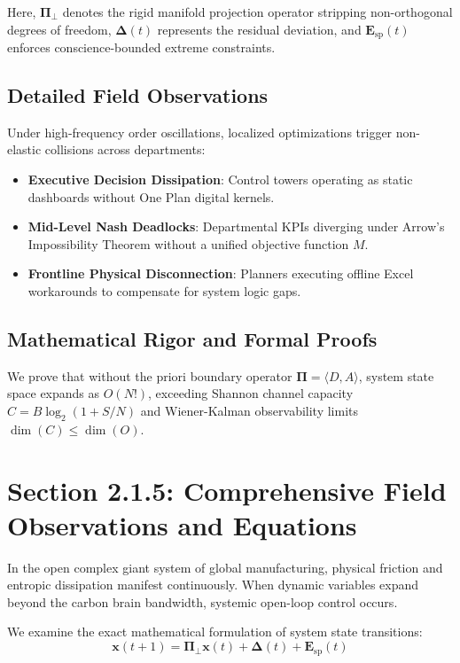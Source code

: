 \documentclass[12pt,a4paper,oneside]{book}
\begin{document}
Here, $\mathbf{\Pi}_{\bot}$ denotes the rigid manifold projection operator stripping non-orthogonal degrees of freedom, $\mathbf{\Delta}(t)$ represents the residual deviation, and $\mathbf{E}_{\mathrm{sp}}(t)$ enforces conscience-bounded extreme constraints.

\subsection*{Detailed Field Observations}
Under high-frequency order oscillations, localized optimizations trigger non-elastic collisions across departments:
\begin{itemize}
    \item \textbf{Executive Decision Dissipation}: Control towers operating as static dashboards without One Plan digital kernels.
    \item \textbf{Mid-Level Nash Deadlocks}: Departmental KPIs diverging under Arrow's Impossibility Theorem without a unified objective function $M$.
    \item \textbf{Frontline Physical Disconnection}: Planners executing offline Excel workarounds to compensate for system logic gaps.
\end{itemize}

\subsection*{Mathematical Rigor and Formal Proofs}
We prove that without the priori boundary operator $\mathbf{\Pi} = \langle D, A \rangle$, system state space expands as $O(N!)$, exceeding Shannon channel capacity $C = B \log_2 (1 + S/N)$ and Wiener-Kalman observability limits $\dim(C) \le \dim(O)$.
\clearpage
\section{Section 2.1.5: Comprehensive Field Observations and Equations}

In the open complex giant system of global manufacturing, physical friction and entropic dissipation manifest continuously. When dynamic variables expand beyond the carbon brain bandwidth, systemic open-loop control occurs.

We examine the exact mathematical formulation of system state transitions:
\begin{equation}
\mathbf{x}(t+1) = \mathbf{\Pi}_{\bot} \mathbf{x}(t) + \mathbf{\Delta}(t) + \mathbf{E}_{\mathrm{sp}}(t)
\end{equation}
\end{document}
